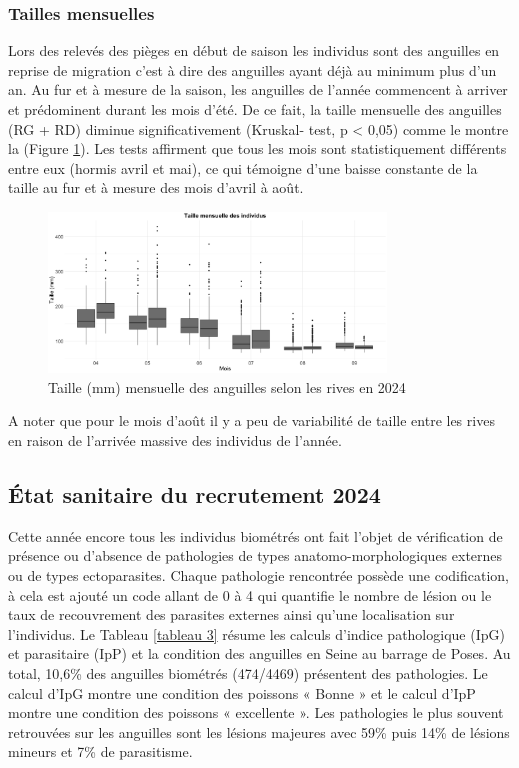 \documentclass[11pt,titlepage,twoside]{article}\usepackage[]{graphicx}\usepackage[table]{xcolor}
\begin{document}
\subsubsection{Tailles mensuelles}

Lors des relevés des pièges en début de saison les individus sont des anguilles en reprise de migration c’est à dire des anguilles ayant déjà au minimum plus d’un an. Au fur et à mesure de la saison, les anguilles de l’année commencent à arriver et prédominent durant les mois d’été. De ce fait, la taille mensuelle des anguilles (RG + RD) diminue significativement (Kruskal- test, p < 0,05) comme le montre la (Figure \ref{taille_mois_oral}). Les tests affirment que tous les mois sont statistiquement différents entre eux (hormis avril et mai), ce qui témoigne d’une baisse constante de la taille au fur et à mesure des mois d’avril à août.


\begin{figure}[htpb]
\centering
\includegraphics[width=0.8\textwidth]{taille_mois_oral.png}
\caption{Taille (mm) mensuelle des anguilles selon les rives en 2024}
\label{taille_mois_oral}
\end{figure} 

A noter que pour le mois d’août il y a peu de variabilité de taille entre les rives en raison de l’arrivée massive des individus de l’année. 

\subsection{État sanitaire du recrutement 2024}

Cette année encore tous les individus biométrés ont fait l’objet de vérification de présence ou d’absence de pathologies de types anatomo-morphologiques externes ou de types ectoparasites. Chaque pathologie rencontrée possède une codification, à cela est ajouté un code allant de 0 à 4 qui quantifie le nombre de lésion ou le taux de recouvrement des parasites externes ainsi qu’une localisation sur l’individus. Le Tableau \ref{tableau 3} résume les calculs d’indice pathologique (IpG) et parasitaire (IpP) et la condition des anguilles en Seine au barrage de Poses. Au total, 10,6\% des anguilles biométrés (474/4469) présentent des pathologies. Le calcul d’IpG montre une condition des poissons « Bonne » et le calcul d’IpP montre une condition des poissons « excellente ».  Les pathologies le plus souvent retrouvées sur les anguilles sont les lésions majeures avec 59\% puis 14\% de lésions mineurs et 7\% de parasitisme.
\end{document}
